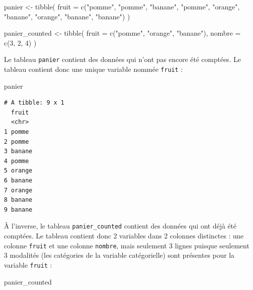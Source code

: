 \documentclass[
  a4paper,
  DIV=11,
  numbers=noendperiod,
  oneside]{scrreprt}
\newenvironment{Shaded}{}{}
\newcommand{\AttributeTok}[1]{\textcolor[rgb]{0.84,0.23,0.29}{#1}}
\newcommand{\DecValTok}[1]{\textcolor[rgb]{0.00,0.36,0.77}{#1}}
\newcommand{\FunctionTok}[1]{\textcolor[rgb]{0.44,0.26,0.76}{#1}}
\newcommand{\NormalTok}[1]{\textcolor[rgb]{0.14,0.16,0.18}{#1}}
\newcommand{\OtherTok}[1]{\textcolor[rgb]{0.44,0.26,0.76}{#1}}
\newcommand{\StringTok}[1]{\textcolor[rgb]{0.01,0.18,0.38}{#1}}
\begin{document}
\begin{Shaded}
\begin{Highlighting}[]
\NormalTok{panier }\OtherTok{\textless{}{-}} \FunctionTok{tibble}\NormalTok{(}
  \AttributeTok{fruit =} \FunctionTok{c}\NormalTok{(}\StringTok{"pomme"}\NormalTok{, }\StringTok{"pomme"}\NormalTok{, }\StringTok{"banane"}\NormalTok{, }\StringTok{"pomme"}\NormalTok{, }\StringTok{"orange"}\NormalTok{, }\StringTok{"banane"}\NormalTok{, }\StringTok{"orange"}\NormalTok{, }\StringTok{"banane"}\NormalTok{, }\StringTok{"banane"}\NormalTok{)}
\NormalTok{)}

\NormalTok{panier\_counted }\OtherTok{\textless{}{-}} \FunctionTok{tibble}\NormalTok{(}
  \AttributeTok{fruit =} \FunctionTok{c}\NormalTok{(}\StringTok{"pomme"}\NormalTok{, }\StringTok{"orange"}\NormalTok{, }\StringTok{"banane"}\NormalTok{),}
  \AttributeTok{nombre =} \FunctionTok{c}\NormalTok{(}\DecValTok{3}\NormalTok{, }\DecValTok{2}\NormalTok{, }\DecValTok{4}\NormalTok{)}
\NormalTok{)}
\end{Highlighting}
\end{Shaded}

Le tableau \texttt{panier} contient des données qui n'ont pas encore été
comptées. Le tableau contient donc une unique variable nommée
\texttt{fruit} :

\begin{Shaded}
\begin{Highlighting}[]
\NormalTok{panier}
\end{Highlighting}
\end{Shaded}

\begin{verbatim}
# A tibble: 9 x 1
  fruit 
  <chr> 
1 pomme 
2 pomme 
3 banane
4 pomme 
5 orange
6 banane
7 orange
8 banane
9 banane
\end{verbatim}

À l'inverse, le tableau \texttt{panier\_counted} contient des données
qui ont déjà été comptées. Le tableau contient donc 2 variables dans 2
colonnes distinctes : une colonne \texttt{fruit} et une colonne
\texttt{nombre}, mais seulement 3 lignes puisque seulement 3 modalités
(les catégories de la variable catégorielle) sont présentes pour la
variable \texttt{fruit} :

\begin{Shaded}
\begin{Highlighting}[]
\NormalTok{panier\_counted}
\end{Highlighting}
\end{Shaded}
\end{document}
